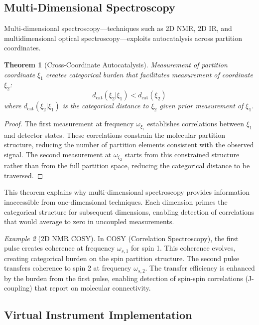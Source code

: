\documentclass[twocolumn,10pt,a4paper]{article}
\newtheorem{theorem}{Theorem}[section]
\theoremstyle{definition}
\theoremstyle{remark}
\newtheorem{example}[theorem]{Example}
\newcommand{\dcat}{d_{\mathrm{cat}}}
\begin{document}
\subsection{Multi-Dimensional Spectroscopy}

Multi-dimensional spectroscopy—techniques such as 2D NMR, 2D IR, and multidimensional optical spectroscopy—exploits autocatalysis across partition coordinates.

\begin{theorem}[Cross-Coordinate Autocatalysis]
\label{thm:cross_coordinate}
Measurement of partition coordinate $\xi_1$ creates categorical burden that facilitates measurement of coordinate $\xi_2$:
\begin{equation}
\dcat(\xi_2 | \xi_1) < \dcat(\xi_2)
\end{equation}
where $\dcat(\xi_2 | \xi_1)$ is the categorical distance to $\xi_2$ given prior measurement of $\xi_1$.
\end{theorem}

\begin{proof}
The first measurement at frequency $\omega_{\xi_1}$ establishes correlations between $\xi_1$ and detector states. These correlations constrain the molecular partition structure, reducing the number of partition elements consistent with the observed signal. The second measurement at $\omega_{\xi_2}$ starts from this constrained structure rather than from the full partition space, reducing the categorical distance to be traversed.
\end{proof}

This theorem explains why multi-dimensional spectroscopy provides information inaccessible from one-dimensional techniques. Each dimension primes the categorical structure for subsequent dimensions, enabling detection of correlations that would average to zero in uncoupled measurements.

\begin{example}[2D NMR COSY]
In COSY (Correlation Spectroscopy), the first pulse creates coherence at frequency $\omega_{s,1}$ for spin 1. This coherence evolves, creating categorical burden on the spin partition structure. The second pulse transfers coherence to spin 2 at frequency $\omega_{s,2}$. The transfer efficiency is enhanced by the burden from the first pulse, enabling detection of spin-spin correlations (J-coupling) that report on molecular connectivity.
\end{example}

\subsection{Virtual Instrument Implementation}
\end{document}
